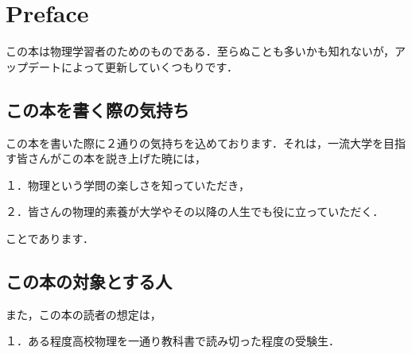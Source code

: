 \documentclass[
  b4paperpaper,
  xelatex,ja=standard]{bxjsbook}
\renewcommand*\contentsname{Table of contents}
\newcommand\contentsname{Table of contents}
\begin{document}
\ifdefined\Shaded\renewenvironment{Shaded}{\begin{tcolorbox}[sharp corners, boxrule=0pt, borderline west={3pt}{0pt}{shadecolor}, colback={codebgcolor}, breakable, enhanced, frame hidden]}{\end{tcolorbox}}\fi

\renewcommand*\contentsname{Table of contents}
{
\hypersetup{linkcolor=}
\setcounter{tocdepth}{2}
\tableofcontents
}

\hypertarget{preface}{%
\chapter*{Preface}\label{preface}}


この本は物理学習者のためのものである．至らぬことも多いかも知れないが，アップデートによって更新していくつもりです．

\hypertarget{ux3053ux306eux672cux3092ux66f8ux304fux969bux306eux6c17ux6301ux3061}{%
\section*{この本を書く際の気持ち}\label{ux3053ux306eux672cux3092ux66f8ux304fux969bux306eux6c17ux6301ux3061}}


この本を書いた際に２通りの気持ちを込めております．それは，一流大学を目指す皆さんがこの本を説き上げた暁には，

１．物理という学問の楽しさを知っていただき，

２．皆さんの物理的素養が大学やその以降の人生でも役に立っていただく．

ことであります．

\hypertarget{ux3053ux306eux672cux306eux5bfeux8c61ux3068ux3059ux308bux4eba}{%
\section*{この本の対象とする人}\label{ux3053ux306eux672cux306eux5bfeux8c61ux3068ux3059ux308bux4eba}}


また，この本の読者の想定は，

１．ある程度高校物理を一通り教科書で読み切った程度の受験生．
\end{document}
